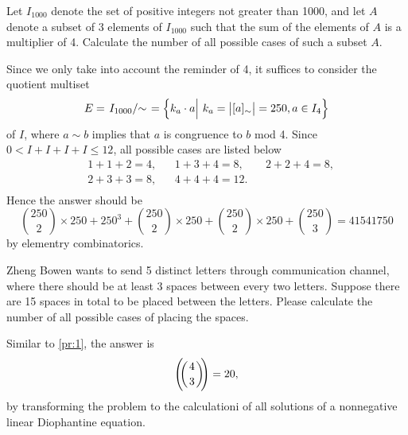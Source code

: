 \documentclass{assignment}[2019/10/15]
\def\multiset#1#2{\ensuremath{\left(\kern-.3em\left(\genfrac{}{}{0pt}{}{#1}{#2}\right)\kern-.3em\right)}}
\newcommand{\lr}[3]{\left#1#3\right#2}
\newcommand{\lmr}[5]{\left#1#4\middle#2#5\right#3}
\begin{document}
    \begin{problem}
        Let $I_{1000}$ denote the set of positive integers not greater than 1000, and let $A$ denote a subset of 3 elements of $I_{1000}$ such that the sum of the elements of $A$ is a multiplier of 4.
        Calculate the number of all possible cases of such a subset $A$.
    \end{problem}
    \begin{solution}
        Since we only take into account the reminder of 4, it suffices to consider the quotient multiset
        \begin{equation}
            E = \lmr./.{I_{1000}}\sim = \lmr\{\vert\}{k_a\cdot a}{\ k_a = \lr||{[a]_\sim}=250, a\in I_{4}}
        \end{equation}
        of $I$, where $a\sim b$ implies that $a$ is congruence to $b$ mod 4.
        Since $0<I + I + I + I\leq 12$, all possible cases are listed below
        \begin{equation}
            \begin{aligned}
                &1+1+2=4, &&1+3+4=8, &&2+2+4=8,\\
                &2+3+3=8, &&4+4+4=12. &&\\
            \end{aligned}
        \end{equation}
        Hence the answer should be
        \begin{equation}
            \binom{250}{2}\times 250
            + 250^3
            + \binom{250}{2}\times 250
            + \binom{250}{2}\times 250
            + \binom{250}{3}
            = 41541750
        \end{equation}
        by elementry combinatorics.
    \end{solution}

    \begin{problem}
        Zheng Bowen wants to send 5 distinct letters through communication channel, where there should be at least 3 spaces between every two letters. Suppose there are 15 spaces in total to be placed between the letters. Please calculate the number of all possible cases of placing the spaces.
    \end{problem}
    \begin{solution}
        Similar to \ref{pr:1}, the answer is
        \begin{equation}
            \multiset{4}{3} = 20,
        \end{equation}
        by transforming the problem to the calculationi of all solutions of a nonnegative linear Diophantine equation.
    \end{solution}
\end{document}

